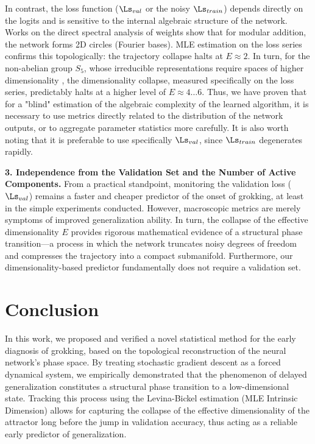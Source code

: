 \documentclass{article}
\begin{document}
In contrast, the loss function ($\Ls_{val}$ or the noisy $\Ls_{train}$) depends directly on the logits and is sensitive to the internal algebraic structure of the network. Works on the direct spectral analysis of weights \cite{nanda2023progress} show that for modular addition, the network forms 2D circles (Fourier bases). MLE estimation on the loss series confirms this topologically: the trajectory collapse halts at $E \approx 2$. In turn, for the non-abelian group $S_5$, whose irreducible representations require spaces of higher dimensionality \cite{chughtai2023toy}, the dimensionality collapse, measured specifically on the loss series, predictably halts at a higher level of $E \approx 4\dots 6$. Thus, we have proven that for a "blind" estimation of the algebraic complexity of the learned algorithm, it is necessary to use metrics directly related to the distribution of the network outputs, or to aggregate parameter statistics more carefully. It is also worth noting that it is preferable to use specifically $\Ls_{val}$, since $\Ls_{train}$ degenerates rapidly.

\textbf{3. Independence from the Validation Set and the Number of Active Components.}
From a practical standpoint, monitoring the validation loss ($\Ls_{val}$) remains a faster and cheaper predictor of the onset of grokking, at least in the simple experiments conducted. However, macroscopic metrics are merely symptoms of improved generalization ability. In turn, the collapse of the effective dimensionality $E$ provides rigorous mathematical evidence of a structural phase transition—a process in which the network truncates noisy degrees of freedom and compresses the trajectory into a compact submanifold. Furthermore, our dimensionality-based predictor fundamentally does not require a validation set. 



\section{Conclusion}\label{sec:concl}

In this work, we proposed and verified a novel statistical method for the early diagnosis of grokking, based on the topological reconstruction of the neural network’s phase space. By treating stochastic gradient descent as a forced dynamical system, we empirically demonstrated that the phenomenon of delayed generalization constitutes a structural phase transition to a low-dimensional state. Tracking this process using the Levina-Bickel estimation (MLE Intrinsic Dimension) allows for capturing the collapse of the effective dimensionality of the attractor long before the jump in validation accuracy, thus acting as a reliable early predictor of generalization.
\end{document}
